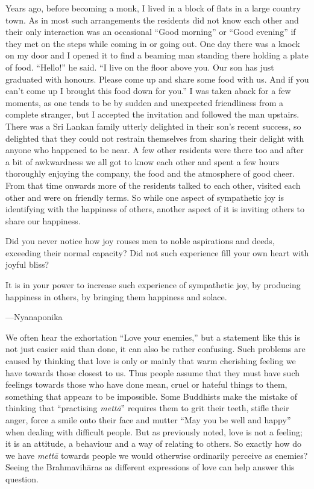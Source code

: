 \documentclass[10pt, openright]{book}
\newenvironment{epigram-2}%
{%
\vspace{1em}
\noindent
\quoting[leftmargin=2.5cm,rightmargin=2.5cm]%
\begin{itshape}
\large
}%
{\end{itshape}\endquoting
}%
\newenvironment{epigram-2-cite}%
{%
\quoting[leftmargin=2.5cm,rightmargin=2.5cm]%
\noindent\normal\hspace*{\fill} 
}%
{\endquoting\vspace{1em}
}%
\begin{document}
Years ago, before becoming a monk, I lived in a block of flats in a large country town. As in most such arrangements the residents did not know each other and their only interaction was an occasional “Good morning” or “Good evening” if they met on the steps while coming in or going out. One day there was a knock on my door and I opened it to find a beaming man standing there holding a plate of food. “Hello!” he said. “I live on the floor above you. Our son has just graduated with honours. Please come up and share some food with us. And if you can’t come up I brought this food down for you.” I was taken aback for a few moments, as one tends to be by sudden and unexpected friendliness from a complete stranger, but I accepted the invitation and followed the man upstairs. There was a Sri Lankan family utterly delighted in their son’s recent success, so delighted that they could not restrain themselves from sharing their delight with anyone who happened to be near. A few other residents were there too and after a bit of awkwardness we all got to know each other and spent a few hours thoroughly enjoying the company, the food and the atmosphere of good cheer. From that time onwards more of the residents talked to each other, visited each other and were on friendly terms. So while one aspect of sympathetic joy is identifying with the happiness of others, another aspect of it is inviting others to share our happiness.


\begin{epigram-2}
Did you never notice how joy rouses men to noble aspirations and deeds, exceeding their normal capacity? Did not such experience fill your own heart with joyful bliss?
\end{epigram-2}

\begin{epigram-2}
It is in your power to increase such experience of sympathetic joy, by producing happiness in others, by bringing them happiness and solace.
\end{epigram-2}

\begin{epigram-2-cite}
—Nyanaponika
\end{epigram-2-cite}

We often hear the exhortation “Love your enemies,” but a statement like this is not just easier said than done, it can also be rather confusing. Such problems are caused by thinking that love is only or mainly that warm cherishing feeling we have towards those closest to us. Thus people assume that they must have such feelings towards those who have done mean, cruel or hateful things to them, something that appears to be impossible. Some Buddhists make the mistake of thinking that “practising \textit{mettā}” requires them to grit their teeth, stifle their anger, force a smile onto their face and mutter “May you be well and happy” when dealing with difficult people. But as previously noted, love is not a feeling; it is an attitude, a behaviour and a way of relating to others. So exactly how do we have \textit{mettā} towards people we would otherwise ordinarily perceive as enemies? Seeing the Brahmavihāras as different expressions of love can help answer this question.
\end{document}
